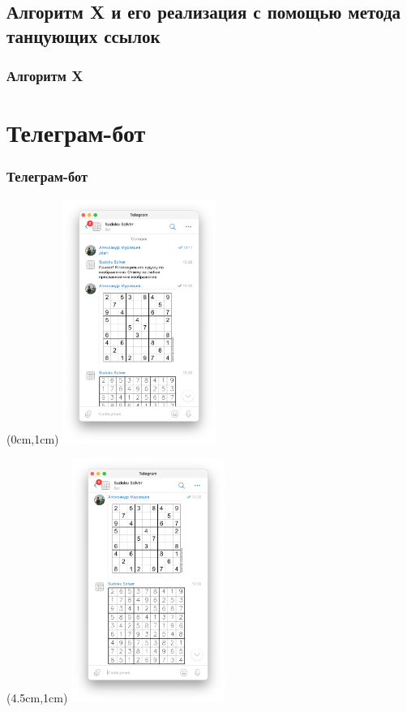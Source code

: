 \documentclass{beamer}
\begin{document}
\subsection{Алгоритм X и его реализация с помощью метода танцующих ссылок}
\begin{frame}
\frametitle{Алгоритм X}

\end{frame}


\section{Телеграм-бот}
\begin{frame}
\frametitle{Телеграм-бот}
\begin{textblock*}{5cm}(0cm,1cm)
\includegraphics[width=5cm]{telegram_screen_1}
\end{textblock*}

\begin{textblock*}{5cm}(4.5cm,1cm)
\includegraphics[width=5cm]{telegram_screen_2}
\end{textblock*}


\end{frame}
\end{document}
